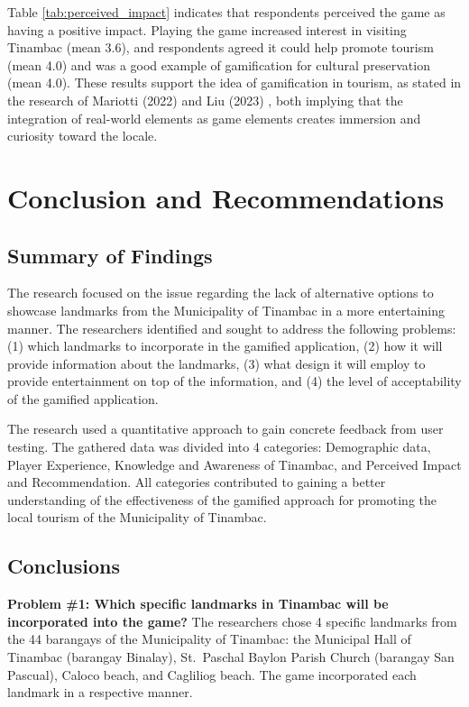 \documentclass{research}
\begin{document}
Table \ref{tab:perceived_impact} indicates that respondents perceived the game as
having a positive impact. Playing the game increased interest in visiting Tinambac
(mean 3.6), and respondents agreed it could help promote tourism (mean 4.0) and was a
good example of gamification for cultural preservation (mean 4.0). These results support
the idea of gamification in tourism, as stated in the research of Mariotti (2022)
\citep{samanta2022} and Liu (2023) \citep{liu2023}, both implying that the integration
of real-world elements as game elements creates immersion and curiosity toward the
locale.


\chapter{Conclusion and Recommendations}

\section{Summary of Findings}

The research focused on the issue regarding the lack of alternative options to showcase
landmarks from the Municipality of Tinambac in a more entertaining manner. The
researchers identified and sought to address the following problems: (1) which landmarks
to incorporate in the gamified application, (2) how it will provide information about
the landmarks, (3) what design it will employ to provide entertainment on top of the
information, and (4) the level of acceptability of the gamified application.

The research used a quantitative approach to gain concrete feedback from user testing.
The gathered data was divided into 4 categories: Demographic data, Player Experience,
Knowledge and Awareness of Tinambac, and Perceived Impact and Recommendation. All
categories contributed to gaining a better understanding of the effectiveness of the
gamified approach for promoting the local tourism of the Municipality of Tinambac.

\section{Conclusions}

\textbf{Problem \#1: Which specific landmarks in Tinambac will be incorporated into
the game?} The researchers chose 4 specific landmarks from the 44 barangays of the
Municipality of Tinambac: the Municipal Hall of Tinambac (barangay Binalay), St.\
Paschal Baylon Parish Church (barangay San Pascual), Caloco beach, and Cagliliog beach.
The game incorporated each landmark in a respective manner.
\end{document}
